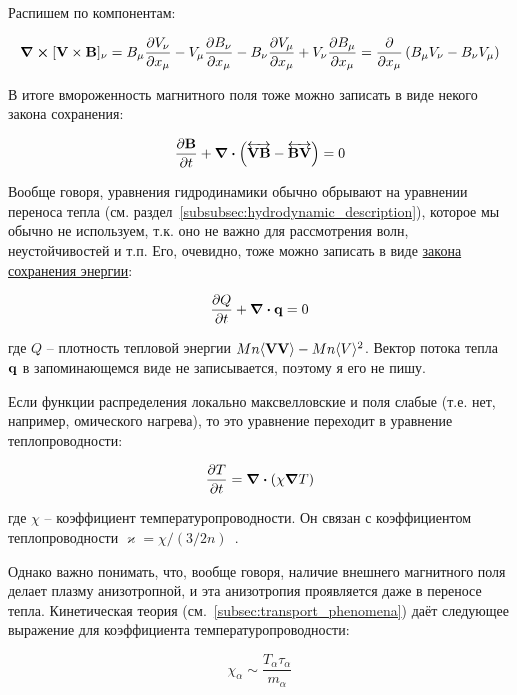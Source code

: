 \documentclass[10pt, a4paper]{article}
\begin{document}
Распишем по компонентам:

\begin{equation*}
	\curl{[\vb{V}\times\vb{B}]}_\nu = B_\mu \pdv{V_\nu}{x_\mu} - V_\mu \pdv{B_\nu}{x_\mu} - B_\nu\pdv{V_\mu}{x_\mu} + V_\nu\pdv{B_\mu}{x_\mu} = \pdv{}{x_\mu}\left( B_\mu V_\nu - B_\nu V_\mu \right)
\end{equation*}

В итоге вмороженность магнитного поля тоже можно записать в виде некого закона сохранения:

\begin{equation*}
	\pdv{\vb{B}}{t} + \div{\left( \overleftrightarrow{\vb{VB}} - \overleftrightarrow{\vb{BV}} \right)} = 0
\end{equation*}

Вообще говоря, уравнения гидродинамики обычно обрывают на уравнении переноса тепла (см. раздел~\ref{subsubsec:hydrodynamic_description}), которое мы обычно не используем, т.к. оно не важно для рассмотрения волн, неустойчивостей и т.п. Его, очевидно, тоже можно записать в виде \uline{закона сохранения энергии}:

\begin{equation*}
	\pdv{Q}{t} + \div{\vb{q}} = 0
\end{equation*}

где $Q$ -- плотность тепловой энергии $Mn\langle \vb{V}\vb{V} \rangle - Mn\langle V\rangle^2$. Вектор потока тепла $\vb{q}$ в запоминающемся виде не записывается, поэтому я его не пишу.

Если функции распределения локально максвелловские и поля слабые (т.е. нет, например, омического нагрева), то это уравнение переходит в уравнение теплопроводности:

\begin{equation}
	\label{eq:heat_equation}
	\pdv{T}{t} = \div{\left( \chi \grad T \right)}
\end{equation}

где $\chi$ -- коэффициент температуропроводности. Он связан с коэффициентом теплопроводности $\varkappa = \chi/(3/2n)$~\cite{kotelnikov}.

Однако важно понимать, что, вообще говоря, наличие внешнего магнитного поля делает плазму анизотропной, и эта анизотропия проявляется даже в переносе тепла. Кинетическая теория (см.~\ref{subsec:transport_phenomena}) даёт следующее выражение для коэффициента температуропроводности:

\begin{equation*}
	\chi_\alpha \sim  \frac{T_\alpha \tau_\alpha}{m_\alpha}
\end{equation*}
\end{document}
